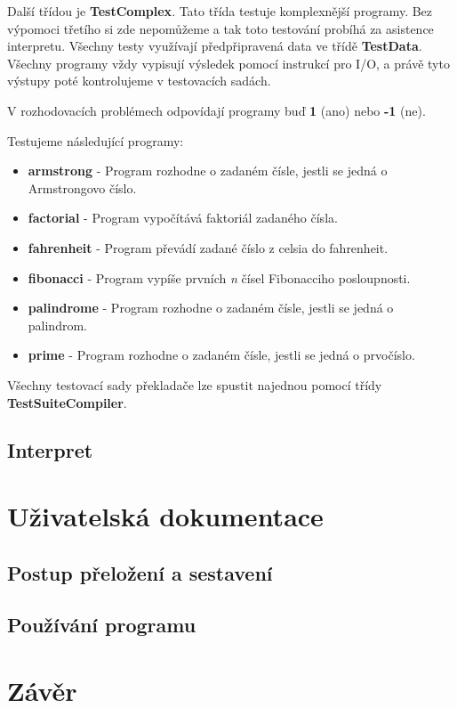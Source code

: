 \documentclass[
12pt,
a4paper,
pdftex,
czech,
titlepage
]{report}
\begin{document}
Další třídou je \textbf{TestComplex}. Tato třída testuje komplexnější programy. Bez výpomoci třetího si zde nepomůžeme a tak toto testování probíhá za asistence interpretu. Všechny testy využívají předpřipravená data ve třídě \textbf{TestData}. Všechny programy vždy vypisují výsledek pomocí instrukcí pro I/O, a právě tyto výstupy poté kontrolujeme v testovacích sadách. 

V rozhodovacích problémech odpovídají programy buď \textbf{1} (ano) nebo \textbf{-1} (ne).

Testujeme následující programy:

\begin{itemize}
\item \textbf{armstrong} - Program rozhodne o zadaném čísle, jestli se jedná o Armstrongovo číslo.
\item \textbf{factorial} - Program vypočítává faktoriál zadaného čísla.
\item \textbf{fahrenheit} - Program převádí zadané číslo z celsia do fahrenheit.
\item \textbf{fibonacci} - Program vypíše prvních \textit{n} čísel Fibonacciho posloupnosti.
\item \textbf{palindrome} - Program rozhodne o zadaném čísle, jestli se jedná o palindrom.
\item \textbf{prime} - Program rozhodne o zadaném čísle, jestli se jedná o prvočíslo.
\end{itemize}

Všechny testovací sady překladače lze spustit najednou pomocí třídy \textbf{TestSuiteCompiler}.

\section{Interpret}

\chapter{Uživatelská dokumentace} 

\section{Postup přeložení a sestavení}

\section{Používání programu}

\chapter{Závěr}
\end{document}
